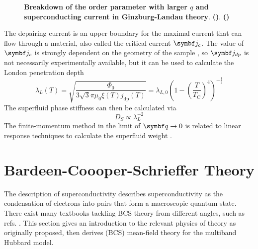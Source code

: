 \documentclass[../notes.tex]{subfiles}
\begin{document}
\begin{figure}[t]
	\centering
	\begin{subfigure}[b]{0.5\textwidth}
		\caption{\hfill\null}\label{sfig:Ginzburg Landau OP vs q}
		\centering
		
	\end{subfigure}%
	\hfill
	\begin{subfigure}[b]{0.5\textwidth}
		\centering
		\caption{\hfill\null}\label{sfig:Ginzburg Landau current vs q}
		
	\end{subfigure}
	\caption{\textbf{Breakdown of the order parameter with larger \(q\) and superconducting current in Ginzburg-Landau theory}. \textbf{()}. \textbf{()}}
	\label{fig:Ginzburg Landau OP and current vs q}
\end{figure}
The depairing current is an upper boundary for the maximal current that can flow through a material, also called the critical current \(\vb{j}_c\).
The value of \(\vb{j}_c\) is strongly dependent on the geometry of the sample \cite{bardeenCriticalFieldsCurrents1962, xuAchievingTheoreticalDepairing2010}, so \(\vb{j}_{dp}\) is not necessarily experimentally available, but it can be used to calculate the London penetration depth \cite{tinkhamIntroductionSuperconductivity1996}
\begin{equation}
	\lambda_L (T) = \sqrt{\frac{\Phi_0}{3 \sqrt{3} \pi \mu_0 \xi(T) j_{\mathrm{dp}} (T)}} = \lambda_{L,0} \left( 1 - \left( \frac{T}{T_{\mathrm{C}}}\right)^4 \right)^{-\frac{1}{2}} 
\end{equation}
The superfluid phase stiffness can then be calculated via
\begin{equation}
	D_S \propto \lambda_L^{-2}
\end{equation}
The finite-momentum method in the limit of \(\vb{q} \to 0\) is related to linear response techniques to calculate the superfluid weight \cite{peottaSuperfluidityTopologicallyNontrivial2015, liangBandGeometryBerry2017}.

\section{Bardeen-Coooper-Schrieffer Theory}\label{sec:bcs-theory}

The  description of superconductivity describes superconductivity as the condensation of electrons into pairs that form a macroscopic quantum state.
There exist many textbooks tackling BCS theory from different angles, such as refs. \cite{colemanIntroductionManyBodyPhysics2015, tinkhamIntroductionSuperconductivity1996}.
This section gives an introduction to the relevant physics of  theory as originally proposed, then derives (BCS) mean-field theory for the multiband Hubbard model.
\end{document}
